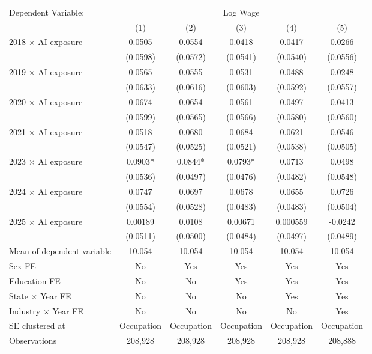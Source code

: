 \def\sym#1{\ifmmode^{#1}\else\(^{#1}\)\fi}
\begin{tabular}{l*{5}{c}}
\toprule
Dependent Variable: & \multicolumn{5}{c}{Log Wage} \\
\cmidrule(lr){2-6}
 & (1) & (2) & (3) & (4) & (5) \\
\midrule
2018 $\times$ AI exposure&      0.0505   &      0.0554   &      0.0418   &      0.0417   &      0.0266   \\
            &    (0.0598)   &    (0.0572)   &    (0.0541)   &    (0.0540)   &    (0.0556)   \\
2019 $\times$ AI exposure&      0.0565   &      0.0555   &      0.0531   &      0.0488   &      0.0248   \\
            &    (0.0633)   &    (0.0616)   &    (0.0603)   &    (0.0592)   &    (0.0557)   \\
2020 $\times$ AI exposure&      0.0674   &      0.0654   &      0.0561   &      0.0497   &      0.0413   \\
            &    (0.0599)   &    (0.0565)   &    (0.0566)   &    (0.0580)   &    (0.0560)   \\
2021 $\times$ AI exposure&      0.0518   &      0.0680   &      0.0684   &      0.0621   &      0.0546   \\
            &    (0.0547)   &    (0.0525)   &    (0.0521)   &    (0.0538)   &    (0.0505)   \\
2023 $\times$ AI exposure&      0.0903*  &      0.0844*  &      0.0793*  &      0.0713   &      0.0498   \\
            &    (0.0536)   &    (0.0497)   &    (0.0476)   &    (0.0482)   &    (0.0548)   \\
2024 $\times$ AI exposure&      0.0747   &      0.0697   &      0.0678   &      0.0655   &      0.0726   \\
            &    (0.0554)   &    (0.0528)   &    (0.0483)   &    (0.0483)   &    (0.0504)   \\
2025 $\times$ AI exposure&     0.00189   &      0.0108   &     0.00671   &    0.000559   &     -0.0242   \\
            &    (0.0511)   &    (0.0500)   &    (0.0484)   &    (0.0497)   &    (0.0489)   \\
\midrule
Mean of dependent variable&      10.054   &      10.054   &      10.054   &      10.054   &      10.054   \\
Sex FE      &          No   &         Yes   &         Yes   &         Yes   &         Yes   \\
Education FE&          No   &          No   &         Yes   &         Yes   &         Yes   \\
State $\times$ Year FE&          No   &          No   &          No   &         Yes   &         Yes   \\
Industry $\times$ Year FE&          No   &          No   &          No   &          No   &         Yes   \\
SE clustered at&  Occupation   &  Occupation   &  Occupation   &  Occupation   &  Occupation   \\
Observations&     208,928   &     208,928   &     208,928   &     208,928   &     208,888   \\
\bottomrule
\end{tabular}

